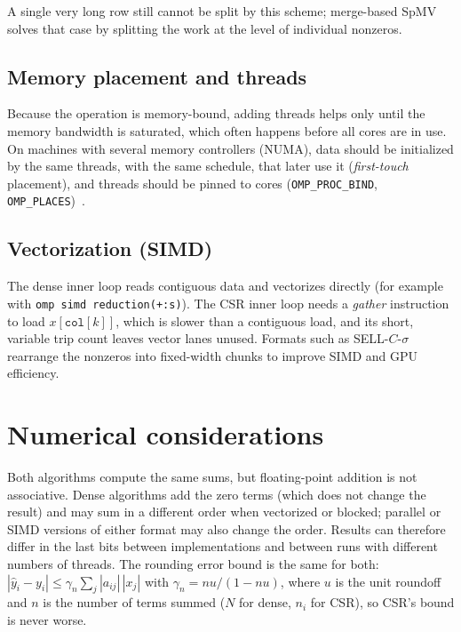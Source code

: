 \documentclass[11pt,a4paper]{article}
\newcommand{\id}[1]{\texttt{#1}}
\begin{document}
\noindent A single very long row still cannot be split by this scheme;
merge-based SpMV~\cite{merrill2016} solves that case by splitting the work at
the level of individual nonzeros.

\subsection{Memory placement and threads}

Because the operation is memory-bound, adding threads helps only until the
memory bandwidth is saturated, which often happens before all cores are in
use. On machines with several memory controllers (NUMA), data should be
initialized by the same threads, with the same schedule, that later use it
(\emph{first-touch} placement), and threads should be pinned to cores
(\texttt{OMP\_PROC\_BIND}, \texttt{OMP\_PLACES})~\cite{vanderpas2017}.

\subsection{Vectorization (SIMD)}

The dense inner loop reads contiguous data and vectorizes directly (for
example with \texttt{omp simd reduction(+:s)}). The CSR inner loop needs a
\emph{gather} instruction to load $x[\id{col}[k]]$, which is slower than a
contiguous load, and its short, variable trip count leaves vector lanes
unused. Formats such as SELL-$C$-$\sigma$~\cite{kreutzer2014} rearrange the
nonzeros into fixed-width chunks to improve SIMD and GPU efficiency.

\section{Numerical considerations}

Both algorithms compute the same sums, but floating-point addition is not
associative. Dense algorithms add the zero terms (which does not change the
result) and may sum in a different order when vectorized or blocked; parallel
or SIMD versions of either format may also change the order. Results can
therefore differ in the last bits between implementations and between runs
with different numbers of threads. The rounding error bound is the same for
both: $|\hat y_i - y_i| \le \gamma_{n} \sum_j |a_{ij}|\,|x_j|$ with
$\gamma_n = n u / (1 - n u)$, where $u$ is the unit roundoff and $n$ is the
number of terms summed ($N$ for dense, $n_i$ for CSR), so CSR's bound is
never worse.
\end{document}

